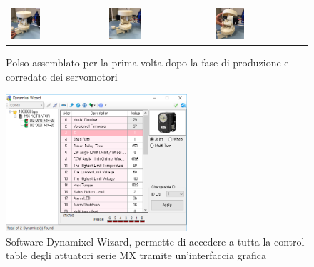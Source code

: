 \documentclass[%
corpo=11pt,
twoside,
 stile=classica,
oldstyle,
greek,%
]{toptesi}
\begin{document}
		\begin{figure}
		\centering
		\begin{tabular}{lll}
			\includegraphics[width=0.33\textwidth]{image/w1.jpg}
			&
			\includegraphics[width=0.33\textwidth]{image/w2.jpg}
			&
			\includegraphics[width=0.33\textwidth]{image/w3.jpg}
		\end{tabular}
		\caption{Polso assemblato per la prima volta dopo la fase di produzione e corredato dei servomotori}
		\label{fig:wristassembled}
	\end{figure}
	\begin{figure}
		\centering
		\includegraphics[width=0.6\textwidth]{image/wizard.png}
		
		\caption{Software Dynamixel Wizard, permette di accedere a tutta la control table degli attuatori serie MX tramite un'interfaccia grafica}
		\label{fig:wizard}
	\end{figure}
	
\end{document}
